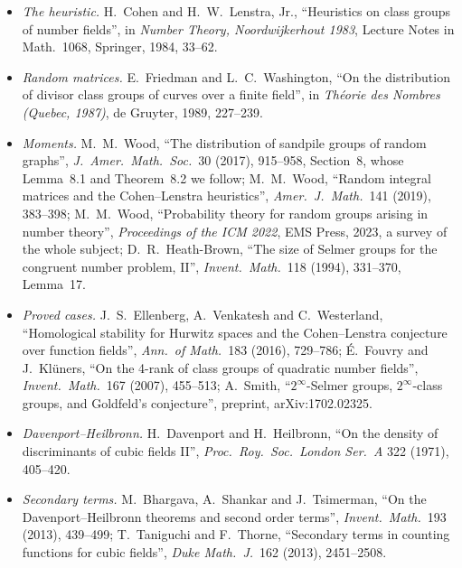 \begin{itemize}
\item \emph{The heuristic.} H.~Cohen and H.~W.~Lenstra, Jr., ``Heuristics on class groups of number fields'', in \emph{Number Theory, Noordwijkerhout 1983}, Lecture Notes in Math.\ 1068, Springer, 1984, 33--62.
\item \emph{Random matrices.} E.~Friedman and L.~C.~Washington, ``On the distribution of divisor class groups of curves over a finite field'', in \emph{Théorie des Nombres (Quebec, 1987)}, de Gruyter, 1989, 227--239.
\item \emph{Moments.} M.~M.~Wood, ``The distribution of sandpile groups of random graphs'', \emph{J.\ Amer.\ Math.\ Soc.}\ 30 (2017), 915--958, Section~8, whose Lemma~8.1 and Theorem~8.2 we follow; M.~M.~Wood, ``Random integral matrices and the Cohen--Lenstra heuristics'', \emph{Amer.\ J.\ Math.}\ 141 (2019), 383--398; M.~M.~Wood, ``Probability theory for random groups arising in number theory'', \emph{Proceedings of the ICM 2022}, EMS Press, 2023, a survey of the whole subject; D.~R.~Heath-Brown, ``The size of Selmer groups for the congruent number problem, II'', \emph{Invent.\ Math.}\ 118 (1994), 331--370, Lemma~17.
\item \emph{Proved cases.} J.~S.~Ellenberg, A.~Venkatesh and C.~Westerland, ``Homological stability for Hurwitz spaces and the Cohen--Lenstra conjecture over function fields'', \emph{Ann.\ of Math.}\ 183 (2016), 729--786; É.~Fouvry and J.~Klüners, ``On the 4-rank of class groups of quadratic number fields'', \emph{Invent.\ Math.}\ 167 (2007), 455--513; A.~Smith, ``$2^\infty$-Selmer groups, $2^\infty$-class groups, and Goldfeld's conjecture'', preprint, arXiv:1702.02325.
\item \emph{Davenport--Heilbronn.} H.~Davenport and H.~Heilbronn, ``On the density of discriminants of cubic fields II'', \emph{Proc.\ Roy.\ Soc.\ London Ser.\ A} 322 (1971), 405--420.
\item \emph{Secondary terms.} M.~Bhargava, A.~Shankar and J.~Tsimerman, ``On the Davenport--Heilbronn theorems and second order terms'', \emph{Invent.\ Math.}\ 193 (2013), 439--499; T.~Taniguchi and F.~Thorne, ``Secondary terms in counting functions for cubic fields'', \emph{Duke Math.\ J.}\ 162 (2013), 2451--2508.
\end{itemize}
